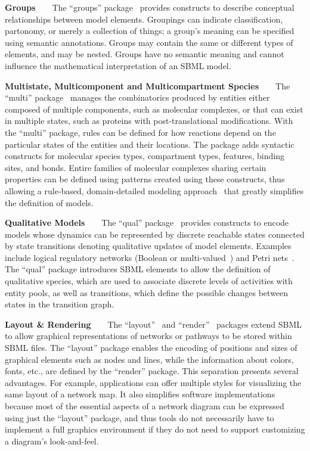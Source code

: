 \documentclass[]{draft-sbml-paper}
\begin{document}
\textbf{Groups}~~~~The ``groups'' package~\citep{hucka2016sbml} provides constructs to describe conceptual relationships between model elements. Groupings can indicate classification, partonomy, or merely a collection of things; a group's meaning can be specified using semantic annotations.  Groups may contain the same or different types of elements, and may be nested. Groups have no semantic meaning and cannot influence the mathematical interpretation of an SBML model.

\textbf{Multistate, Multicomponent and Multicompartment Species}~~~~The ``multi'' package~\citep{zhang2018multi} manages the combinatorics produced by entities either composed of multiple components, such as molecular complexes, or that can exist in multiple states, such as proteins with post-translational modifications. With the ``multi'' package, rules can be defined for how reactions depend on the particular states of the entities and their locations. The package adds syntactic constructs for molecular species types, compartment types, features, binding sites, and bonds.  Entire families of molecular complexes sharing certain properties can be defined using patterns created using these constructs, thus allowing a rule-based, domain-detailed modeling approach~\citep{Blinov2004, Stefan2014multistate, Chylek2014rulebased} that greatly simplifies the definition of models.

\textbf{Qualitative Models}~~~~The ``qual'' package~\citep{Chaouiya2015sbml} provides constructs to encode models whose dynamics can be represented by discrete reachable states connected by state transitions denoting qualitative updates of model elements. Examples include logical regulatory networks (Boolean or multi-valued~\citep{abou2016logical}) and Petri nets~\citep{chaouiya2007petri}. The ``qual'' package introduces SBML elements to allow the definition of qualitative species, which are used to associate discrete levels of activities with entity pools, as well as transitions, which define the possible changes between states in the transition graph.

\textbf{Layout \& Rendering}~~~~The ``layout''~\citep{Gauges2015} and ``render''~\citep{Bergmann2018sbml} packages extend SBML to allow graphical representations of networks or pathways to be stored within SBML files. The ``layout'' package enables the encoding of positions and sizes of graphical elements such as nodes and lines, while the information about colors, fonts, etc., are defined by the ``render'' package. This separation presents several advantages. For example, applications can offer multiple styles for visualizing the same layout of a network map. It also simplifies software implementations because most of the essential aspects of a network diagram can be expressed using just the ``layout'' package, and thus tools do not necessarily have to implement a full graphics environment if they do not need to support customizing a diagram's look-and-feel.
\end{document}
